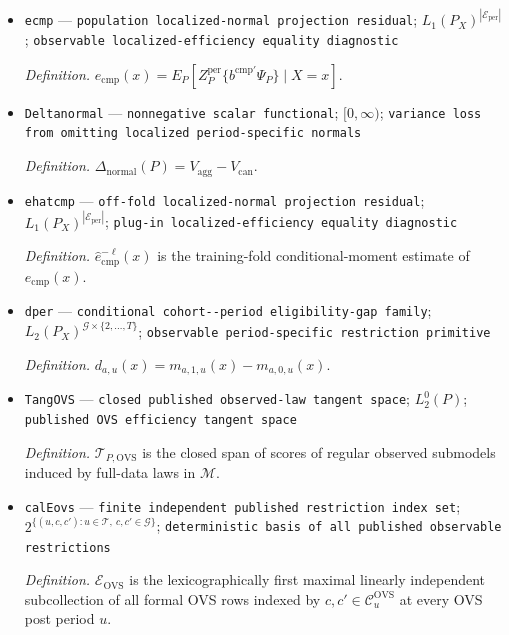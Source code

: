 \documentclass{article}
\begin{document}
\begin{itemize}
  \item \texttt{ecmp} --- \texttt{population localized-\allowbreak{}normal projection residual}; \(L_1(P_X)^{|\mathcal E_{\mathrm{per}}|}\); \texttt{observable localized-\allowbreak{}efficiency equality diagnostic}
  \par\smallskip\noindent\emph{Definition.} \(e_{\mathrm{cmp}}(x)=E_P[Z_P^{\mathrm{per}}\{b^{\mathrm{cmp}\prime}\Psi_P\}\mid X=x]\).
  \item \texttt{Deltanormal} --- \texttt{nonnegative scalar functional}; \([0,\infty)\); \texttt{variance loss from omitting localized period-\allowbreak{}specific normals}
  \par\smallskip\noindent\emph{Definition.} \(\Delta_{\mathrm{normal}}(P)=V_{\mathrm{agg}}-V_{\mathrm{can}}\).
  \item \texttt{ehatcmp} --- \texttt{off-\allowbreak{}fold localized-\allowbreak{}normal projection residual}; \(L_1(P_X)^{|\mathcal E_{\mathrm{per}}|}\); \texttt{plug-\allowbreak{}in localized-\allowbreak{}efficiency equality diagnostic}
  \par\smallskip\noindent\emph{Definition.} \(\widehat e_{\mathrm{cmp}}^{-\ell}(x)\) is the training-fold conditional-moment estimate of \(e_{\mathrm{cmp}}(x)\).
  \item \texttt{dper} --- \texttt{conditional cohort-\allowbreak{}-\allowbreak{}period eligibility-\allowbreak{}gap family}; \(L_2(P_X)^{\mathcal G\times\{2,\ldots,T\}}\); \texttt{observable period-\allowbreak{}specific restriction primitive}
  \par\smallskip\noindent\emph{Definition.} \(d_{a,u}(x)=m_{a,1,u}(x)-m_{a,0,u}(x)\).
  \item \texttt{TangOVS} --- \texttt{closed published observed-\allowbreak{}law tangent space}; \(L_2^0(P)\); \texttt{published OVS efficiency tangent space}
  \par\smallskip\noindent\emph{Definition.} \(\mathcal T_{P,\mathrm{OVS}}\) is the closed span of scores of regular observed submodels induced by full-data laws in \(\mathcal M\).
  \item \texttt{calEovs} --- \texttt{finite independent published restriction index set}; \(2^{\{(u,c,c'):u\in\mathcal T,\ c,c'\in\mathcal G\}}\); \texttt{deterministic basis of all published observable restrictions}
  \par\smallskip\noindent\emph{Definition.} \(\mathcal E_{\mathrm{OVS}}\) is the lexicographically first maximal linearly independent subcollection of all formal OVS rows indexed by \(c,c'\in\mathcal C_u^{\mathrm{OVS}}\) at every OVS post period \(u\).

\end{itemize}
\end{document}
